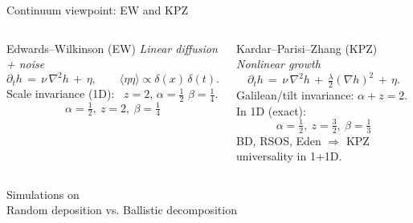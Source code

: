 \documentclass[9pt,table,xcolor=dvipsnames]{beamer}
\begin{document}
\begin{frame}[t]{Continuum viewpoint: EW and KPZ}
  \small
  \begin{columns}[T,onlytextwidth]
    \begin{assblock}{Edwards--Wilkinson (EW)}
      \emph{Linear diffusion + noise}
      \[
        \partial_t h \,=\, \nu\,\nabla^2 h \,+\, \eta,
        \qquad \langle\eta\eta\rangle \propto \delta(x)\,\delta(t).
      \]
      Scale invariance (1D): \ $z=2$, $\alpha=\tfrac12$ \Rightarrow $\beta=\tfrac14$.
      \[
        \boxed{\alpha=\tfrac12\!,\ z=2\!,\ \beta=\tfrac14}
      \]
    \end{assblock}

    \begin{problock}{Kardar--Parisi--Zhang (KPZ)}
      \emph{Nonlinear growth}
      \[
        \partial_t h \,=\, \nu\,\nabla^2 h \,+\, \tfrac{\lambda}{2}(\nabla h)^2 \,+\, \eta.
      \]
      Galilean/tilt invariance: $\alpha+z=2$. In 1D (exact):
      \[
        \boxed{\alpha=\tfrac12\!,\ z=\tfrac32\!,\ \beta=\tfrac13}
      \]
      \vspace{-0.3em}
      {\footnotesize BD, RSOS, Eden $\Rightarrow$ KPZ universality in 1+1D.}
    \end{problock}
  \end{columns}
\end{frame}
\begin{frame}[fragile] %
  \begin{center}
    \Large Simulations on \\ \bigskip
    Random deposition vs. Ballistic decomposition
  \end{center}
\end{frame}
\end{document}
